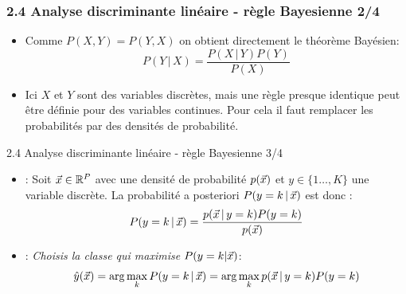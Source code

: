 \begin{frame}
\frametitle{2.4 Analyse discriminante linéaire - règle Bayesienne 2/4}
\begin{itemize}
\item Comme $P(X,Y)=P(Y,X)$ on obtient directement le théorème Bayésien:
\begin{equation}
  P(Y \, | \, X) = \frac{P(X \, | \, Y)P(Y)}{P(X)}
\end{equation}
\item Ici $X$ et $Y$ sont des variables discrètes, mais une règle presque identique peut être définie pour des variables continues. Pour cela il faut remplacer les probabilités par des densités de probabilité. 
\end{itemize}


\end{frame}

\begin{frame}{2.4 Analyse discriminante linéaire - règle Bayesienne 3/4}

\begin{itemize}
  \item {}: Soit $\vec{x} \in \mathbb{R}^P$ avec une densité de probabilité $p(\vec{x})$ et $y \in \{1 \ldots, K\}$ une variable discrète. La probabilité a posteriori $P(y=k\,|\,\vec{x})$ est donc :
  \begin{equation}
    P(y=k \, | \, \vec{x}) = \frac{p(\vec{x} \, | \, y=k) P(y=k)}{p(\vec{x})}
  \end{equation}
  \item {}: \emph{Choisis la classe qui maximise} $P(y=k|\vec{x})$:
  \begin{equation}
    \hat{y}(\vec{x}) = \arg\max_k P(y=k \, | \, \vec{x}) = \arg\max_k p(\vec{x}\,|\,y=k)P(y=k)
  \end{equation}
\end{itemize}
\end{frame}


